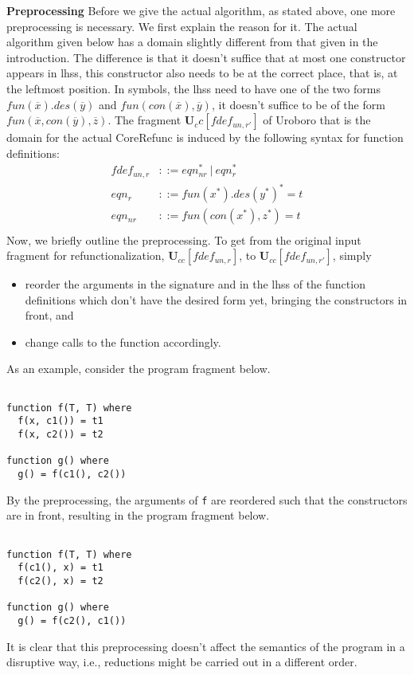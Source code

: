 \textbf{Preprocessing } Before we give the actual algorithm, as stated above, one more preprocessing is necessary. We first explain the reason for it. The actual algorithm given below has a domain slightly different from that given in the introduction. The difference is that it doesn't suffice that at most one constructor appears in lhss, this constructor also needs to be at the correct place, that is, at the leftmost position. In symbols, the lhss need to have one of the two forms $fun(\overline{x}).des(\overline{y})$ and $fun(con(\overline{x}), \overline{y})$, it doesn't suffice to be of the form $fun(\overline{x}, con(\overline{y}), \overline{z})$. The fragment $\mathbf{U}_cc[fdef_{un,r'}]$ of Uroboro that is the domain for the actual \textsf{CoreRefunc} is induced by the following syntax for function definitions:
\begin{align*}
fdef_{un,r} &::= eqn_{nr}^* ~ | ~ eqn_r^* \\
eqn_r &::= fun(x^*).des(y^*)^* = t \\
eqn_{nr} &::= fun(con(x^*), z^*) = t \\
\end{align*}
Now, we briefly outline the preprocessing. To get from the original input fragment for refunctionalization, $\mathbf{U}_{cc}[fdef_{un,r}]$, to $\mathbf{U}_{cc}[fdef_{un,r'}]$, simply
\begin{itemize}
\item reorder the arguments in the signature and in the lhss of the function definitions which don't have the desired form yet, bringing the constructors in front, and
\item change calls to the function accordingly.
\end{itemize}
As an example, consider the program fragment below.
\begin{lstlisting}

function f(T, T) where
  f(x, c1()) = t1
  f(x, c2()) = t2

function g() where
  g() = f(c1(), c2())

\end{lstlisting}
By the preprocessing, the arguments of \texttt{f} are reordered such that the constructors are in front, resulting in the program fragment below.
\begin{lstlisting}

function f(T, T) where
  f(c1(), x) = t1
  f(c2(), x) = t2

function g() where
  g() = f(c2(), c1())

\end{lstlisting}
It is clear that this preprocessing doesn't affect the semantics of the program in a disruptive way, i.e., reductions might be carried out in a different order.

